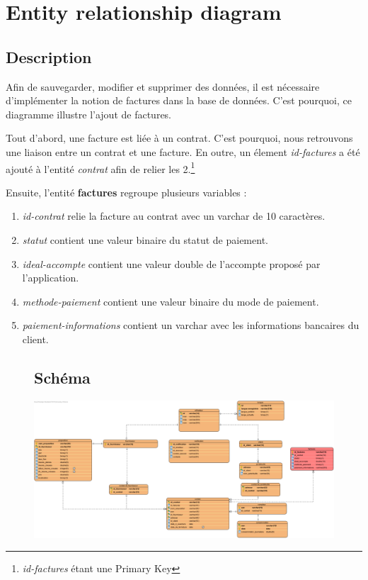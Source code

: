 \section{Entity relationship diagram}
\subsection{Description}

\begin{flushleft}
Afin de sauvegarder, modifier et supprimer des données, il est nécessaire d'implémenter la notion de factures dans la base de données. C'est pourquoi, ce diagramme illustre l'ajout de factures.
\end{flushleft}

\begin{flushleft}
Tout d'abord, une facture est liée à un contrat. C'est pourquoi, nous retrouvons une liaison entre un contrat et une facture. En outre, un élement \emph{id-factures} a été ajouté à l'entité \emph{contrat} afin de relier les 2.\footnote{\emph{id-factures} étant une Primary Key}
\end{flushleft}

\begin{flushleft}
Ensuite, l'entité \textbf{factures} regroupe plusieurs variables : 
\end{flushleft}
\begin{enumerate}[-]

\item \emph{id-contrat} relie la facture au contrat avec un varchar de 10 caractères.

\item \emph{statut} contient une valeur binaire du statut de paiement.

\item \emph{ideal-accompte} contient une valeur double de l'accompte proposé par l'application.

\item \emph{methode-paiement} contient une valeur binaire du mode de paiement.

\item \emph{paiement-informations} contient un varchar avec les informations bancaires du client.

\end{enumerate}

\newpage
\begin{figure}[h]
\subsection{Schéma}
\centering
\includegraphics[width = 1.2\textwidth]{extension-maxime/bdd/img/bdd-extension.png}
\end{figure}
